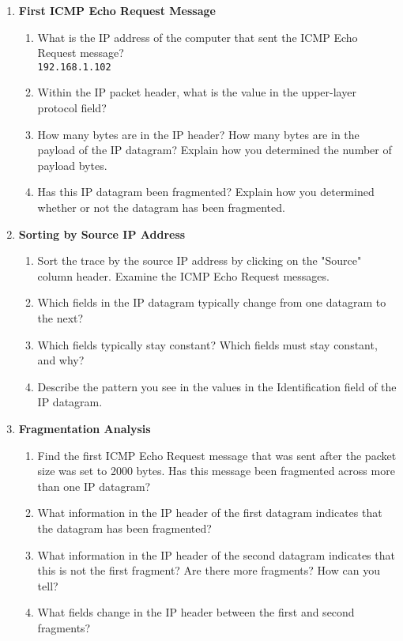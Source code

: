 \documentclass[12pt]{article}
\begin{document}
\begin{enumerate}[label=Q\arabic*:]
    \item \textbf{First ICMP Echo Request Message}
          \begin{enumerate}[label=(\alph*)]
              \item What is the IP address of the computer that sent the ICMP Echo Request message? \\
                    \texttt{192.168.1.102}
              \item Within the IP packet header, what is the value in the upper-layer protocol field?
                    
              \item How many bytes are in the IP header? How many bytes are in the payload of the IP datagram? Explain how you determined the number of payload bytes.
              \item Has this IP datagram been fragmented? Explain how you determined whether or not the datagram has been fragmented.
          \end{enumerate}

    \item \textbf{Sorting by Source IP Address}
          \begin{enumerate}[label=(\alph*)]
              \item Sort the trace by the source IP address by clicking on the "Source" column header. Examine the ICMP Echo Request messages.
              \item Which fields in the IP datagram typically change from one datagram to the next?
              \item Which fields typically stay constant? Which fields must stay constant, and why?
              \item Describe the pattern you see in the values in the Identification field of the IP datagram.
          \end{enumerate}

    \item \textbf{Fragmentation Analysis}
          \begin{enumerate}[label=(\alph*)]
              \item Find the first ICMP Echo Request message that was sent after the packet size was set to 2000 bytes. Has this message been fragmented across more than one IP datagram?
              \item What information in the IP header of the first datagram indicates that the datagram has been fragmented?
              \item  What information in the IP header of the second datagram indicates that this is not the first fragment? Are there more fragments? How can you tell?
              \item What fields change in the IP header between the first and second fragments?
          \end{enumerate}


\end{enumerate}
\end{document}
